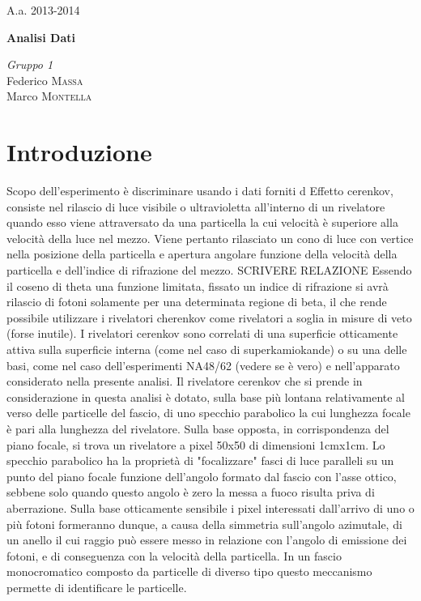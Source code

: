 \documentclass[8pt]{extarticle}
\begin{document}
\justify
\printindex
\Large{A.a. 2013-2014}
\vspace{10cm}
\begin{center}
\Huge\textbf{Analisi Dati}
\end{center}

\vspace{2cm}
\begin{flushleft}
\textit{Gruppo \textsc{1}} \\
\medskip
Federico \textsc{Massa} \\ 
Marco \textsc{Montella}
\end{flushleft}



\newpage

\begin{abstract}
\justify
 

\end{abstract}
\bigskip

\section{Introduzione} \label{sec:intro}
Scopo dell'esperimento è discriminare usando i dati forniti d
Effetto cerenkov, consiste nel rilascio di luce visibile o ultravioletta all'interno di un rivelatore quando esso viene attraversato da una
particella la cui velocità è superiore alla velocità della luce nel mezzo.
Viene pertanto rilasciato un cono di luce con vertice nella posizione della particella e apertura angolare funzione della velocità della particella
e dell'indice di rifrazione del mezzo. SCRIVERE RELAZIONE
Essendo il coseno di theta una funzione limitata, fissato un indice di rifrazione si avrà rilascio di fotoni solamente per una determinata regione di beta, il che rende possibile utilizzare i rivelatori cherenkov come rivelatori a soglia in misure di veto (forse inutile).
I rivelatori cerenkov sono correlati di una superficie otticamente attiva sulla superficie interna (come nel caso di superkamiokande) o su una delle basi, come nel caso dell'esperimenti NA48/62 (vedere se è vero) e nell'apparato considerato nella presente analisi. Il rivelatore cerenkov
che si prende in considerazione in questa analisi è dotato, sulla base più lontana relativamente al verso delle particelle del fascio, di uno specchio parabolico la cui lunghezza focale è pari alla lunghezza del rivelatore. Sulla base opposta, in corrispondenza del piano focale, si trova un rivelatore a pixel 50x50 di dimensioni 1cmx1cm. Lo specchio parabolico ha la proprietà di "focalizzare" fasci di luce paralleli su un punto del piano focale funzione dell'angolo formato dal fascio con l'asse ottico, sebbene solo quando questo angolo è zero la messa a fuoco risulta priva di aberrazione. Sulla base otticamente sensibile i pixel interessati dall'arrivo di uno o più fotoni formeranno dunque, a causa della simmetria sull'angolo azimutale, di un anello il cui raggio può essere messo in relazione con l'angolo di emissione dei fotoni, e di conseguenza con la velocità della particella. In un fascio monocromatico composto da particelle di diverso tipo questo meccanismo permette di identificare le particelle.
\end{document}
